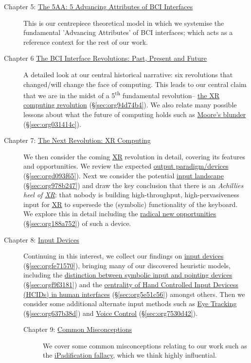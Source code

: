 \documentclass[logo,bsc,singlespacing,parskip]{infthesis}
\begin{document}
\begin{description}
\item[{Chapter 5: \hyperref[sec:org921fce9]{The 5AA: 5 Advancing Attributes of BCI Interfaces}}] This is our centrepiece theoretical model in which we systemise the fundamental 'Advancing Attributes' of BCI interfaces; which acts as a reference context for the rest of our work.

\item[{Chapter 6 \hyperref[sec:org64b3156]{The BCI Interface Revolutions: Past, Present and Future}}] A detailed look at our central historical narrative: six revolutions that changed/will change the face of computing.
This leads to our central claim that we are in the midst of a 5\textsuperscript{th} fundamental revolution-- \hyperref[sec:org94d74b4]{the XR computing revolution} (\S \ref{sec:org94d74b4}).
We also relate many possible lessons about what the future of computing holds such as \hyperref[sec:org031414c]{Moore's blunder} (\S \ref{sec:org031414c}).

\item[{Chapter 7: \hyperref[sec:org13573e8]{The Next Revolution: XR Computing}}] We then consider the coming \hyperref[org1d567af]{XR} revolution in detail, covering its features and opportunities.
We review the expected \hyperref[sec:orgd093f65]{output paradigm/devices} (\S \ref{sec:orgd093f65}).
Next we consider the potential \hyperref[sec:org978b247]{input landscape} (\S \ref{sec:org978b247}) and draw the key conclusion that there is an \emph{Achillies heel of \hyperref[org1d567af]{XR}}: that nobody is building high-throughput, high-pervasiveness input for \hyperref[org1d567af]{XR} to supersede the (symbolic) functionality of the keyboard.
We explore this in detail including the \hyperref[sec:org188a752]{radical new opportunities} (\S \ref{sec:org188a752}) of such a device.

\item[{Chapter 8: \hyperref[sec:orgfe71570]{Input Devices}}] Continuing in this interest, we collect our findings on \hyperref[sec:orgfe71570]{input devices} (\S \ref{sec:orgfe71570}), bringing many of our discovered heuristic models, including the \hyperref[sec:orgf9f3181]{distinction between symbolic input and pointing devices} (\S \ref{sec:orgf9f3181}) and the \hyperref[sec:org5e51c56]{centrality of Hand Controlled Input Devicess (HCIDs) in human interfaces} (\S \ref{sec:org5e51c56}) amongst others.
Then we consider some additional alternate input methods such as \hyperref[sec:org637b38d]{Eye Tracking} (\S \ref{sec:org637b38d}) and \hyperref[sec:org7530d42]{Voice Control} (\S \ref{sec:org7530d42}).

\begin{description}
\item[{Chapter 9: \hyperref[sec:org67d9006]{Common Misconceptions}}] We cover some common misconceptions relating to our work such as the \hyperref[ipadification fallacy]{iPadification fallacy}, which we think highly influential.
\end{description}
\end{description}
\end{document}
